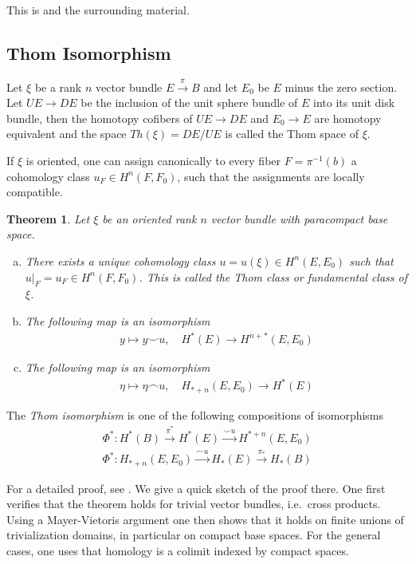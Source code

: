 \documentclass{scrartcl}
\theoremstyle{plain}
\newtheorem{theorem}{Theorem}[section]
\theoremstyle{definition}
\newcommand{\capp}{\mathbin{\frown}}
\newcommand{\cupp}{\mathbin{\smile}}
\begin{document}
This is \cite[Thm 3.43]{hatcher2002algebraic} and the surrounding material.

\subsection{Thom Isomorphism}
Let $\xi$ be a rank $n$ vector bundle $E\xrightarrow{\pi} B$ and let $E_0$ be $E$ minus the zero section. Let $UE\to DE$ be the inclusion of the unit sphere bundle of $E$ into its unit disk bundle, then the homotopy cofibers of $UE\to DE$ and $E_0\to E$ are homotopy equivalent and the space $Th(\xi) = DE / UE$ is called the Thom space of $\xi$. 

If $\xi$ is oriented, one can assign canonically to every fiber $F=\pi^{-1}(b)$ a cohomology class $u_F\in H^n(F, F_0)$, such that the assignments are locally compatible.

\begin{theorem}
    Let $\xi$ be an oriented rank $n$ vector bundle with paracompact base space.
    \begin{enumerate}[(a)]
        \item There exists a unique cohomology class $u=u(\xi)\in H^n(E, E_0)$ such that $u|_F = u_F\in H^n(F, F_0)$. This is called the \emph{Thom class} or fundamental class of $\xi$.
        \item The following map is an isomorphism
        \begin{align*}
            y \mapsto y\cupp u, \quad H^*(E) \to H^{n+*}(E, E_0)    
        \end{align*}
        \item The following map is an isomorphism
        \begin{align*}
            \eta \mapsto \eta\capp u, \quad H_{*+n}(E, E_0) \to H^{*}(E)
        \end{align*}
    \end{enumerate}
\end{theorem}

The \emph{Thom isomorphism} is one of the following compositions of isomorphisms
\begin{align*}
    \Phi^*\colon H^*(B)\xrightarrow{\pi^*}H^*(E)\xrightarrow{\cupp u}H^{*+n}(E, E_0) \\
    \Phi^*\colon H_{*+n}(E, E_0) \xrightarrow{\capp u} H_*(E)\xrightarrow{\pi_*}H_*(B)
\end{align*}

For a detailed proof, see \cite{milnor1974characteristic}. We give a quick sketch of the proof there. One first verifies that the theorem holds for trivial vector bundles, i.e.\ cross products. Using a Mayer-Vietoris argument one then shows that it holds on finite unions of trivialization domains, in particular on compact base spaces. For the general cases, one uses that homology is a colimit indexed by compact spaces.
\end{document}
